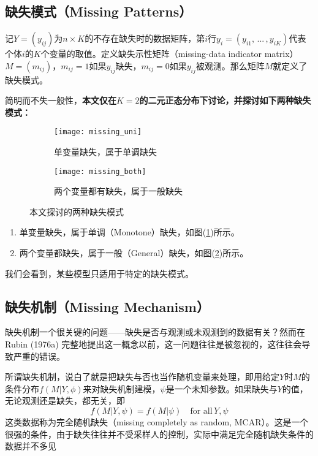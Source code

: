 \documentclass[aps,pre,12pt,preprint,onecolumn,showpacs,showkeys,AutoFakeBold]{revtex4-1}
\begin{document}
    \subsection{缺失模式（Missing Patterns）}
    记$Y=(y_{ij})$为$n\times K$的不存在缺失时的数据矩阵，第$i$行$y_i=(y_{i1},\,...\,,y_{iK})$代表个体$i$的$K$个变量的取值。定义缺失示性矩阵（missing-data indicator matrix）$M=(m_{ij})$，$m_{ij}=1$如果$y_{ij}$缺失，$m_{ij}=0$如果$y_{ij}$被观测。那么矩阵$M$就定义了缺失模式。

    简明而不失一般性，\textbf{本文仅在$K=2$的二元正态分布下讨论，并探讨如下两种缺失模式：}
    \begin{figure}[ht]
        \begin{subfigure}[t]{45mm}
			\centering
			\texttt{[image: missing\_uni]}
			\caption{单变量缺失，属于单调缺失}\label{fig:missing_uni}
		\end{subfigure}
		\begin{subfigure}[t]{45mm}
			\centering
			\texttt{[image: missing\_both]}
			\caption{两个变量都有缺失，属于一般缺失}\label{fig:missing_both}
		\end{subfigure}
        \caption{\label{fig:missing_pattern}%
        本文探讨的两种缺失模式}
    \end{figure}
    \begin{enumerate}
        \item 单变量缺失，属于单调（Monotone）缺失，如图(\ref{fig:missing_uni})所示。
        \item 两个变量都缺失，属于一般（General）缺失，如图(\ref{fig:missing_both})所示。
    \end{enumerate}

    我们会看到，某些模型只适用于特定的缺失模式。

    \subsection{缺失机制（Missing Mechanism）}
    缺失机制一个很关键的问题——缺失是否与观测或未观测到的数据有关？然而在Rubin (1976a) 完整地提出这一概念以前，这一问题往往是被忽视的，这往往会导致严重的错误。

    所谓缺失机制，说白了就是把缺失与否也当作随机变量来处理，即用给定$Y$时$M$的条件分布$f(M\vert Y, \phi)$来对缺失机制建模，$\psi$是一个未知参数。如果缺失与$Y$的值，无论观测还是缺失，都无关，即
    \begin{equation}\label{eq:MCAR}
        f(M\vert Y,\psi)=f(M\vert \psi)\quad \text{for all}\, Y, \psi 
    \end{equation}
    这类数据称为完全随机缺失（missing completely as random, MCAR）。这是一个很强的条件，由于缺失往往并不受采样人的控制，实际中满足完全随机缺失条件的数据并不多见
\end{document}
